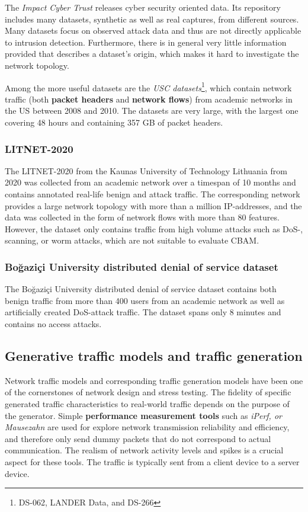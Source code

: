 The \textit{Impact Cyber Trust} releases cyber security oriented data. Its repository includes many datasets, synthetic as well as real captures, from different sources. Many datasets focus on observed attack data and thus are not directly applicable to intrusion detection. Furthermore, there is in general very little information provided that describes a dataset's origin, which makes it hard to investigate the network topology.

Among the more useful datasets are the \textit{USC datasets}\footnote{DS-062, LANDER Data, and DS-266}, which contain network traffic (both \textbf{packet headers} and \textbf{network flows}) from academic networks in the US between 2008 and 2010. The datasets are very large, with the largest one covering 48 hours and containing 357 GB of packet headers. 

\subsubsection{LITNET-2020 \cite{damasevicius2020litnet}}

The LITNET-2020 from the Kaunas University of Technology Lithuania from 2020 was collected from an academic network over a timespan of 10 months and contains annotated real-life benign and attack traffic. The corresponding network provides a large network topology with more than a million IP-addresses, and the data was collected in the form of network flows with more than 80 features. However, the dataset only contains traffic from high volume attacks such as DoS-, scanning, or worm attacks, which are not suitable to evaluate CBAM.

\subsubsection{Bo{\u{g}}azi{\c{c}}i University distributed denial of service dataset} \cite{erhan2020bougazicci}

The Bo{\u{g}}azi{\c{c}}i University distributed denial of service dataset contains both benign traffic from more than 400 users from an academic network as well as artificially created DoS-attack traffic. The dataset spans only 8 minutes and contains no access attacks.

\subsection{Generative traffic models and traffic generation}

Network traffic models and corresponding traffic generation models have been one of the cornerstones of network design and stress testing. 
The fidelity of specific generated traffic characteristics to real-world traffic depends on the purpose of the generator. Simple \textbf{performance measurement tools} such as \textit{iPerf, or Mausezahn} are used for explore network transmission reliability and efficiency, and therefore only send dummy packets that do not correspond to actual communication. The realism of network activity levels and spikes is a crucial aspect for these tools. The traffic is typically sent from a client device to a server device.

